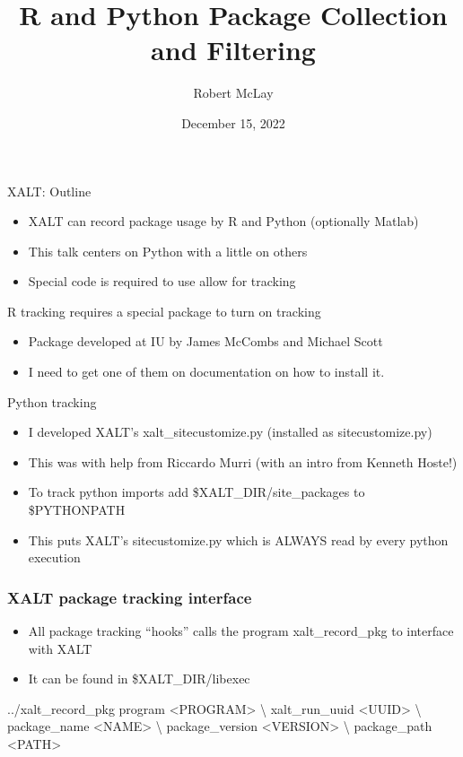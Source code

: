 \documentclass{beamer}
\begin{document}
\title[XALT]{R and Python Package Collection and Filtering}
\author{Robert McLay}
\date{December 15, 2022}

\frame{\titlepage}

\begin{frame}{XALT: Outline}
  \begin{itemize}
    \item XALT can record package usage by R and Python (optionally Matlab)
    \item This talk centers on Python with a little on others
    \item Special code is required to use allow for tracking
  \end{itemize}
\end{frame}

\begin{frame}{R tracking requires a special package to turn on tracking}
  \begin{itemize}
    \item Package developed at IU by James McCombs and Michael Scott
    \item I need to get one of them on documentation on how to install it.
  \end{itemize}
\end{frame}

\begin{frame}{Python tracking}
  \begin{itemize}
    \item I developed XALT's xalt\_sitecustomize.py (installed as sitecustomize.py)
    \item This was with help from Riccardo Murri (with an intro from
      Kenneth Hoste!)
    \item To track python imports add \$XALT\_DIR/site\_packages to
      \$PYTHONPATH
    \item This puts XALT's sitecustomize.py which is ALWAYS read by
      every python execution
  \end{itemize}
\end{frame}

\begin{frame}[fragile]
    \frametitle{XALT package tracking interface}
  \begin{itemize}
    \item All package tracking ``hooks'' calls the program
      xalt\_record\_pkg to interface with XALT
    \item It can be found in \$XALT\_DIR/libexec
  \end{itemize}
 {\small
    \begin{semiverbatim}
../xalt\_record\_pkg program          <PROGRAM> \textbackslash
                   xalt\_run\_uuid    <UUID>    \textbackslash
                   package\_name     <NAME>     \textbackslash
                   package\_version  <VERSION>  \textbackslash
                   package\_path     <PATH>
    \end{semiverbatim}
}
\end{frame}
\end{document}

